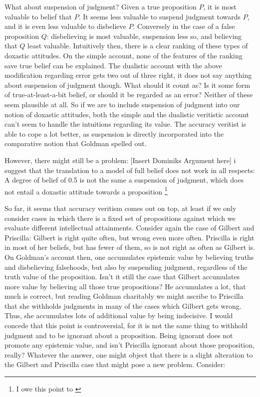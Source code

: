 \documentclass[12pt,numbers=noenddot]{scrartcl}
\begin{document}
What about suspension of judgment? Given a true proposition $P$, it is most valuable to belief that $P$. It seems less valuable to suspend judgment towards $P$, and it is even less valuable to disbelieve $P$. Conversely in the case of a false proposition $Q$: disbelieving is most valuable, suspension less so, and believing that $Q$ least valuable. Intuitively then, there is a clear ranking of these types of doxastic attitudes. On the simple account, none of the features of the ranking save true belief can be explained. The dualistic account with the above modification regarding error gets two out of three right, it does not say anything about suspension of judgment though. What should it count as? Is it some form of true-at-least-a-bit belief, or should it be regarded as an error? Neither of these seem plausible at all. So if we are to include suspension of judgment into our notion of doxastic attitudes, both the simple and the dualistic veritistic account can't seem to handle the intuitions regarding its value. The accuracy veritist is able to cope a lot better, as suspension is directly incorporated into the comparative notion that Goldman spelled out.

However, there might still be a problem: [Insert Dominiks Argument here] i suggest that the translation to a model of full belief does not work in all respects: A degree of belief of 0.5 is not the same a suspension of judgment, which does not entail a doxastic attitude towards a proposition \footnote{I owe this point to \textcite{Balg2018} }

So far, it seems that accuracy veritism comes out on top, at least if we only consider cases in which there is a fixed set of propositions against which we evaluate different intellectual attainments. Consider again the case of Gilbert and Priscilla: Gilbert is right quite often, but wrong even more often. Priscilla is right in most of her beliefs, but has fewer of them, so is not right as often as Gilbert is. On Goldman's account then, one accumulates epistemic value by believing truths and disbelieving falsehoods, but also by suspending judgment, regardless of the truth value of the proposition. Isn't it still the case that Gilbert accumulates more value by believing all those true propositions? He accumulates a lot, that much is correct, but reading Goldman charitably we might ascribe to Priscilla that she withholds judgments in many of the cases which Gilbert gets wrong. Thus, she accumulates lots of additional value by being indecisive. I would concede that this point is controversial, for it is not the same thing to withhold judgment and to be ignorant about a proposition. Being ignorant does not promote any epistemic value, and isn't Priscilla ignorant about those proposition, really? Whatever the answer, one might object that there is a slight alteration to the Gilbert and Priscilla case that might pose a new problem. Consider:
\end{document}
